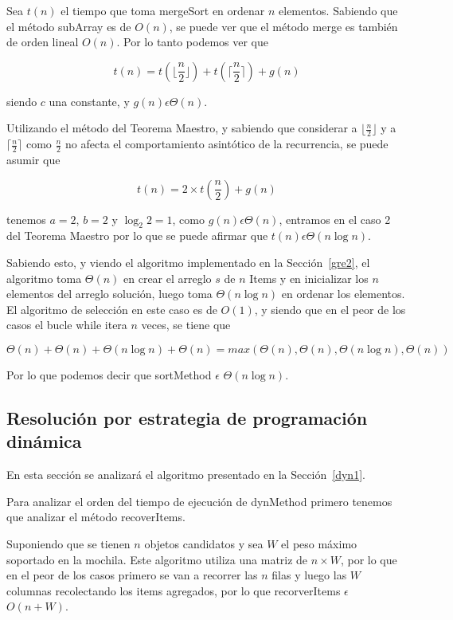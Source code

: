 \documentclass[a4paper,10pt,spanish]{article}
\begin{document}
	Sea $t(n)$ el tiempo que toma mergeSort en ordenar $n$ elementos. Sabiendo que el m\'etodo subArray es de $O(n)$, se puede ver que el m\'etodo merge es tambi\'en de orden lineal $O(n)$. Por lo tanto podemos ver que

\[
 t(n)=t(\lfloor\frac{n}{2}\rfloor) + t(\lceil\frac{n}{2}\rceil) + g(n)
\]

siendo $c$ una constante, y $g(n) \epsilon \Theta(n)$.

Utilizando el m\'etodo del Teorema Maestro, y sabiendo que considerar a $\lfloor\frac{n}{2}\rfloor$ y a $\lceil\frac{n}{2}\rceil$ como $\frac{n}{2}$ no afecta el comportamiento asint\'otico de la recurrencia, se puede asumir que 

\[
 t(n)=2\times t(\frac{n}{2}) + g(n)
\]
	
	tenemos $a = 2$, $b = 2$ y $\log_2 2 = 1$, como $g(n) \epsilon \Theta(n)$, entramos en el caso 2 del Teorema Maestro por lo que se puede afirmar que $t(n) \epsilon \Theta(n\log n)$.
	
	Sabiendo esto, y viendo el algoritmo implementado en la Secci\'on~\ref{gre2}, el algoritmo toma $\Theta(n)$ en crear el arreglo $s$ de $n$ Items y en inicializar los $n$ elementos del arreglo soluci\'on, luego toma $\Theta (n\log n)$ en ordenar los elementos. El algoritmo de selecci\'on en este caso es de $O(1)$, y siendo que en el peor de los casos el bucle while itera $n$ veces, se tiene que
	
	\[
	 \Theta (n) + \Theta (n) + \Theta (n\log n) + \Theta (n) = max(\Theta (n), \Theta (n), \Theta (n\log n), \Theta (n)) 
	\]
	
	Por lo que podemos decir que sortMethod $ \epsilon $ $\Theta (n\log n)$.
	
	\subsection{Resoluci\'on por estrategia de programaci\'on din\'amica}
	En esta secci\'on se analizar\'a el algoritmo presentado en la Secci\'on~\ref{dyn1}.
	
	\vspace{4mm}
	Para analizar el orden del tiempo de ejecuci\'on de dynMethod primero tenemos que analizar el m\'etodo recoverItems.
	
	Suponiendo que se tienen $n$ objetos candidatos y sea $W$ el peso m\'aximo soportado en la mochila. Este algoritmo utiliza una matriz de $n\times W$, por lo que en el peor de los casos primero se van a recorrer las $n$ filas y luego las $W$ columnas recolectando los items agregados, por lo que recorverItems $\epsilon$ $O(n + W)$.
	
\end{document}
